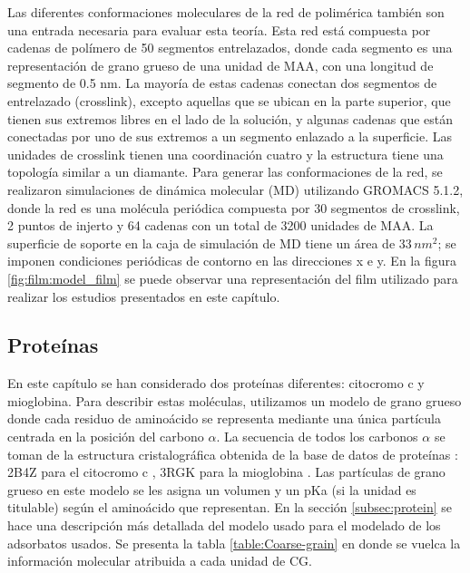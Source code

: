 Las diferentes conformaciones moleculares de la red de polim\'erica tambi\'en son una entrada necesaria para evaluar esta teor\'ia. Esta red est\'a compuesta por cadenas de pol\'imero de 50 segmentos entrelazados, donde cada segmento es una representaci\'on de grano grueso de una unidad de MAA, con una longitud de segmento de 0.5 nm. La mayor\'ia de estas cadenas conectan dos segmentos de entrelazado (crosslink), excepto aquellas que se ubican en la parte superior, que tienen sus extremos libres en el lado de la soluci\'on, y algunas cadenas que est\'an conectadas por uno de sus extremos a un segmento enlazado a la superficie. Las unidades de crosslink tienen una coordinaci\'on cuatro y la estructura tiene una topolog\'ia similar a un diamante. Para generar las conformaciones de la red, se realizaron simulaciones de din\'amica molecular (MD) utilizando GROMACS 5.1.2, donde la red es una mol\'ecula peri\'odica compuesta por 30 segmentos de crosslink, 2 puntos de injerto y 64 cadenas con un total de 3200 unidades de MAA. La superficie de soporte en la caja de simulaci\'on de MD tiene un \'area de $33\, nm^2$; se imponen condiciones peri\'odicas de contorno en las direcciones x e y. 
En la figura \ref{fig:film:model_film} se puede observar una representaci\'on del film utilizado para realizar los estudios presentados en este cap\'itulo.


\subsection{Prote\'inas}

En este cap\'itulo se han considerado dos prote\'inas diferentes: citocromo c y mioglobina.
Para describir estas mol\'eculas, utilizamos un modelo de grano grueso donde cada residuo de amino\'acido se representa mediante una \'unica part\'icula centrada en la posici\'on del carbono $\alpha$.
La secuencia de todos los carbonos $\alpha$ se toman de la estructura cristalogr\'afica obtenida de la base de datos de prote\'inas \cite{berman2000protein}: 2B4Z para el citocromo c \cite{mirkin2008high},  3RGK para la mioglobina \cite{hubbard1990x}.
Las part\'iculas de grano grueso en este modelo se les asigna un volumen y un pKa (si la unidad es titulable) seg\'un el amino\'acido que representan.
En la secci\'on \ref{subsec:protein} se hace una descripci\'on m\'as detallada del modelo usado para el modelado de los adsorbatos usados.  Se presenta la tabla \ref{table:Coarse-grain} en donde se vuelca la informaci\'on molecular atribuida a cada unidad de CG.


